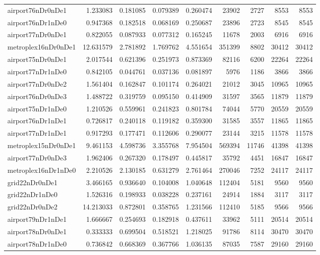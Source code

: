 \documentclass[../../../thesis.tex]{subfiles}
\begin{document}
\begin{longtable}{|l|r|r|r|r|r|r|r|r|}
airport76nDr0nDe1 & 1.233083 & 0.181085 & 0.079389 & 0.260474 & 23902 & 2727 & 8553 & 8553 \\
airport76nDr1nDe0 & 0.947368 & 0.182518 & 0.068169 & 0.250687 & 23896 & 2723 & 8545 & 8545 \\
airport77nDr0nDe1 & 0.822055 & 0.087933 & 0.077312 & 0.165245 & 11678 & 2003 & 6916 & 6916 \\
metroplex16nDr0nDe1 & 12.631579 & 2.781892 & 1.769762 & 4.551654 & 351399 & 8802 & 30412 & 30412 \\
airport75nDr0nDe1 & 2.017544 & 0.621396 & 0.251973 & 0.873369 & 82116 & 6200 & 22264 & 22264 \\
airport77nDr1nDe0 & 0.842105 & 0.044761 & 0.037136 & 0.081897 & 5976 & 1186 & 3866 & 3866 \\
airport77nDr0nDe2 & 1.561404 & 0.162847 & 0.101174 & 0.264021 & 21012 & 3045 & 10965 & 10965 \\
airport76nDr0nDe3 & 1.488722 & 0.319759 & 0.095150 & 0.414909 & 31597 & 3565 & 11879 & 11879 \\
airport75nDr1nDe0 & 1.210526 & 0.559961 & 0.241823 & 0.801784 & 74044 & 5770 & 20559 & 20559 \\
airport76nDr1nDe1 & 0.726817 & 0.240118 & 0.119182 & 0.359300 & 31585 & 3557 & 11865 & 11865 \\
airport77nDr1nDe1 & 0.917293 & 0.177471 & 0.112606 & 0.290077 & 23144 & 3215 & 11578 & 11578 \\
metroplex15nDr0nDe1 & 9.461153 & 4.598736 & 3.355768 & 7.954504 & 569394 & 11746 & 41398 & 41398 \\
airport77nDr0nDe3 & 1.962406 & 0.267320 & 0.178497 & 0.445817 & 35792 & 4451 & 16847 & 16847 \\
metroplex16nDr1nDe0 & 2.210526 & 2.130185 & 0.631279 & 2.761464 & 270046 & 7252 & 24117 & 24117 \\
grid22nDr0nDe1 & 3.466165 & 0.936640 & 0.104008 & 1.040648 & 112404 & 5181 & 9560 & 9560 \\
grid22nDr1nDe0 & 1.526316 & 0.198933 & 0.038228 & 0.237161 & 24914 & 1884 & 3117 & 3117 \\
grid22nDr0nDe2 & 14.213033 & 0.872801 & 0.358765 & 1.231566 & 112410 & 5185 & 9566 & 9566 \\
airport79nDr1nDe1 & 1.666667 & 0.254693 & 0.182918 & 0.437611 & 33962 & 5111 & 20514 & 20514 \\
airport78nDr0nDe1 & 0.333333 & 0.699504 & 0.518521 & 1.218025 & 91786 & 8114 & 30470 & 30470 \\
airport78nDr1nDe0 & 0.736842 & 0.668369 & 0.367766 & 1.036135 & 87035 & 7587 & 29160 & 29160 \\

\end{longtable}
\end{document}
